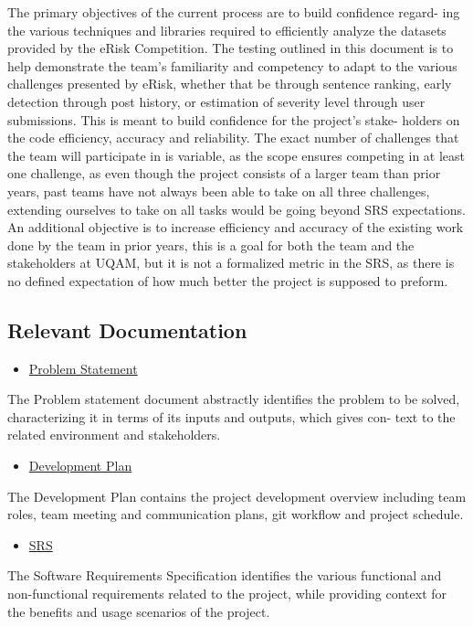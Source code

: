 \documentclass[12pt, titlepage]{article}
\begin{document}
The primary objectives of the current process are to build confidence regard-
ing the various techniques and libraries required to efficiently analyze the
datasets provided by the eRisk Competition. The testing outlined in this
document is to help demonstrate the team's familiarity and competency to adapt to
the various challenges presented by eRisk, whether that be through sentence
ranking, early detection through post history, or estimation of severity level
through user submissions. This is meant to build confidence for the project's stake-
holders on the code efficiency, accuracy and reliability. The exact number of
challenges that the team will participate in is variable, as the scope ensures
competing in at least one challenge, as even though the project consists of a larger team than prior years, past teams have not always been able to take on
all three challenges, extending ourselves to take on all tasks would be going
beyond SRS expectations. An additional objective is to increase efficiency
and accuracy of the existing work done by the team in prior years, this is
a goal for both the team and the stakeholders at UQAM, but it is not a
formalized metric in the SRS, as there is no defined expectation of how much
better the project is supposed to preform.

\subsection{Relevant Documentation}
\begin{itemize}
	\item \href{https://github.com/MichaelBreau/nlp-mentalhealth/blob/main/docs/ProblemStatementAndGoals/ProblemStatement.pdf}{Problem Statement}
\end{itemize}
The Problem statement document abstractly identifies the problem to be
solved, characterizing it in terms of its inputs and outputs, which gives con-
text to the related environment and stakeholders.

\begin{itemize}
	\item \href{https://github.com/MichaelBreau/nlp-mentalhealth/blob/main/docs/DevelopmentPlan/DevelopmentPlan.pdf}{Development Plan}
\end{itemize}
The Development Plan contains the project development overview including
team roles, team meeting and communication plans, git workflow and project
schedule.

\begin{itemize}
	\item \href{https://github.com/MichaelBreau/nlp-mentalhealth/blob/main/docs/SRS-Meyer/index.pdf}{SRS}
\end{itemize}
The Software Requirements Specification identifies the various functional and
non-functional requirements related to the project, while providing context
for the benefits and usage scenarios of the project.
\end{document}
